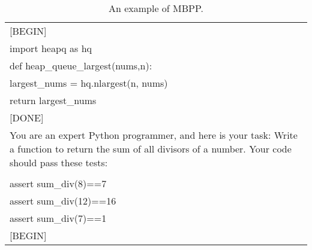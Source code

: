 \begin{table}[ht]
\begin{tabular}{p{12cm}}
[BEGIN]\\
import heapq as hq\\
def heap\_queue\_largest(nums,n):\\
  largest\_nums = hq.nlargest(n, nums)\\
  return largest\_nums\\

[DONE]\\
You are an expert Python programmer, and here is your task: Write a function to return the sum of all divisors of a number. Your code should pass these tests:\\
\\
assert sum\_div(8)==7\\
assert sum\_div(12)==16\\
assert sum\_div(7)==1\\

[BEGIN]\\
\bottomrule
\end{tabular}
    \caption{\centering An example of MBPP.}
    \label{tab:mbpp_eval_format_example}
\end{table}

